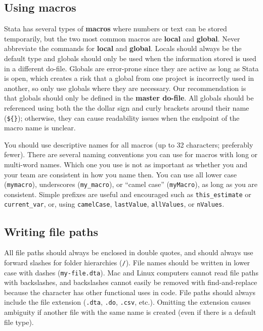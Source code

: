 \subsection*{Using macros}

Stata has several types of \textbf{macros} where numbers or text can be stored temporarily,
but the two most common macros are \textbf{local} and \textbf{global}.
Never abbreviate the commands for \textbf{local} and \textbf{global}.
Locals should always be the default type and globals should only
be used when the information stored is used in a different do-file.
Globals are error-prone since they are active as long as Stata is open,
which creates a risk that a global from one project is incorrectly used in another,
so only use globals where they are necessary.
Our recommendation is that globals should only be defined in the \textbf{master do-file}.
All globals should be referenced using both the the dollar sign and curly brackets around their name (\texttt{\$\{\}});
otherwise, they can cause readability issues when the endpoint of the macro name is unclear.

You should use descriptive names for all macros (up to 32 characters; preferably fewer).
There are several naming conventions you can use for macros with long or multi-word names.
Which one you use is not as important as whether you and your team are consistent in how you name then.
You can use all lower case (\texttt{mymacro}), underscores (\texttt{my\_macro}),
or ``camel case'' (\texttt{myMacro}), as long as you are consistent.
Simple prefixes are useful and encouraged such as \texttt{this\_estimate} or \texttt{current\_var},
or, using \texttt{camelCase}, \texttt{lastValue}, \texttt{allValues}, or \texttt{nValues}.


\subsection*{Writing file paths}

All file paths should always be enclosed in double quotes,
and should always use forward slashes for folder hierarchies (\texttt{/}).
File names should be written in lower case with dashes (\texttt{my-file.dta}).
Mac and Linux computers cannot read file paths with backslashes,
and backslashes cannot easily be removed with find-and-replace
because the character has other functional uses in code.
File paths should always include the file extension
(\texttt{.dta}, \texttt{.do}, \texttt{.csv}, etc.).
Omitting the extension causes ambiguity
if another file with the same name is created
(even if there is a default file type).


